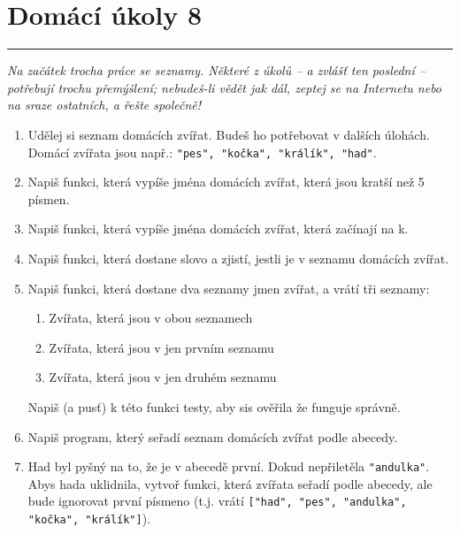 \documentclass[a4paper,10pt]{article}
\newcommand\plsetno{8}
\newcommand\startsection[1]{
     \vspace{0.2ex}
    \hrule
    {\fontspec{Oxygen} \tiny
     \vspace{-1ex}
     \emph{#1}
     \vspace{-1.5em}
    }
}
\begin{document}
\section*{Domácí úkoly \plsetno}

\startsection{Na začátek trocha práce se seznamy.
    Některé z úkolů – a zvlášť ten poslední – potřebují trochu přemýšlení;
    nebudeš-li vědět jak dál, zeptej se na Internetu nebo na sraze ostatních,
    a řešte společně!}

\begin{enumerate}

\item Udělej si seznam domácích zvířat. Budeš ho potřebovat v dalších úlohách.
    \\Domácí zvířata jsou např.: \verb+"pes", "kočka", "králík", "had"+.


\item Napiš funkci, která vypíše jména domácích zvířat, která jsou kratší než 5 písmen.

\item Napiš funkci, která vypíše jména domácích zvířat, která začínají na k.

\item Napiš funkci, která dostane slovo a zjistí,
    jestli je v seznamu domácích zvířat.

\item Napiš funkci, která dostane dva seznamy jmen zvířat, a vrátí tři seznamy:
    \begin{enumerate}
        \item Zvířata, která jsou v obou seznamech
        \item Zvířata, která jsou v jen prvním seznamu
        \item Zvířata, která jsou v jen druhém seznamu
    \end{enumerate}
    Napiš (a pusť) k této funkci testy, aby sis ověřila že funguje správně.

\item Napiš program, který seřadí seznam domácích zvířat podle abecedy.

\item Had byl pyšný na to, že je v abecedě první.
    Dokud nepřiletěla \verb+"andulka"+.
    \\Abys hada uklidnila, vytvoř funkci, která zvířata seřadí podle abecedy,
    ale bude ignorovat první písmeno (t.j. vrátí
        \texttt{["h{\color{plpink}ad}",
                 "p{\color{plpink}es}",
                 "a{\color{plpink}ndulka}",
                 "k{\color{plpink}očka}",
                 "k{\color{plpink}rálík}"]}).


\end{enumerate}
\end{document}
